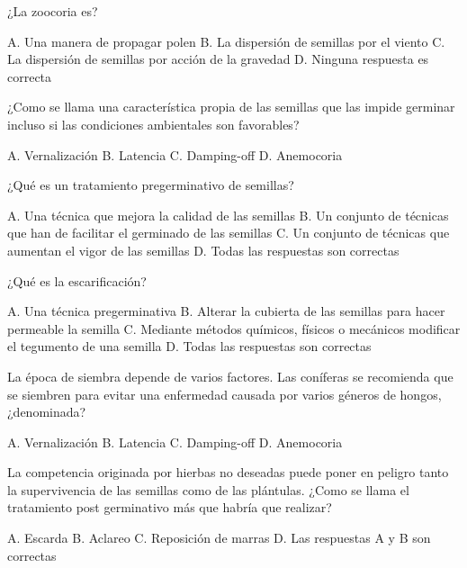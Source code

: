 \documentclass[11pt]{exam}
\begin{document}
{\begin{questions}
\begin{checkboxes}
  \end{checkboxes}
\question ¿La zoocoria es?
  \begin{checkboxes}
    \choice A. Una manera de propagar polen
    \choice B. La dispersión de semillas por el viento
    \choice C. La dispersión de semillas por acción de la gravedad
    \CorrectChoice D. Ninguna respuesta es correcta 
  \end{checkboxes}
\question ¿Como se llama una característica propia de las semillas que las impide germinar
  incluso si las condiciones ambientales son favorables?
  \begin{checkboxes}
    \choice A. Vernalización
    \CorrectChoice B. Latencia
    \choice C. Damping-off
    \choice D. Anemocoria
  \end{checkboxes}
\question ¿Qué es un tratamiento pregerminativo de semillas?
  \begin{checkboxes}
    \choice A. Una técnica que mejora la calidad de las semillas
    \CorrectChoice B. Un conjunto de técnicas que han de facilitar el germinado de las
    semillas
    \choice C. Un conjunto de técnicas que aumentan el vigor de las semillas
    \choice D. Todas las respuestas son correctas
  \end{checkboxes}
\question ¿Qué es la escarificación?
  \begin{checkboxes}
    \choice A. Una técnica pregerminativa
    \choice B. Alterar la cubierta de las semillas para hacer permeable la semilla
    \choice C. Mediante métodos químicos, físicos o mecánicos modificar el tegumento de
    una semilla
    \CorrectChoice D. Todas las respuestas son correctas 
  \end{checkboxes}
\question La época de siembra depende de varios factores. Las coníferas se recomienda que
  se siembren para evitar una enfermedad causada por varios géneros de hongos, ¿denominada?
  \begin{checkboxes}
    \choice A. Vernalización
    \choice B. Latencia
    \CorrectChoice C. Damping-off
    \choice D. Anemocoria    
  \end{checkboxes}
\question La competencia originada por hierbas no deseadas puede poner en peligro tanto la
  supervivencia de las semillas como de las plántulas. ¿Como se llama el tratamiento post
  germinativo más que habría que realizar?
  \begin{checkboxes}
    \CorrectChoice A. Escarda
    \choice B. Aclareo
    \choice C. Reposición de marras
    \choice D. Las respuestas A y B son correctas
  \end{checkboxes}

\end{questions}}
\end{document}
